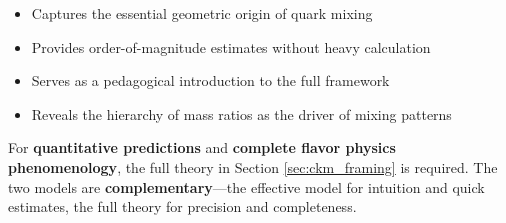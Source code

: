 \begin{itemize}
    \item Captures the essential geometric origin of quark mixing
    \item Provides order-of-magnitude estimates without heavy calculation
    \item Serves as a pedagogical introduction to the full framework
    \item Reveals the hierarchy of mass ratios as the driver of mixing patterns
\end{itemize}

For \textbf{quantitative predictions} and \textbf{complete flavor physics phenomenology}, the full theory in Section \ref{sec:ckm_framing} is required. The two models are \textbf{complementary}—the effective model for intuition and quick estimates, the full theory for precision and completeness.
